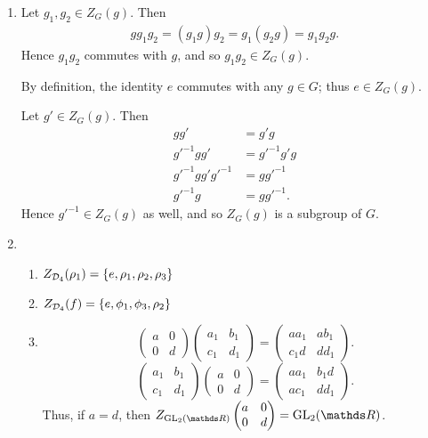 \documentclass{homework}
\begin{document}
\begin{solution}
  \begin{enumerate}[label=(\alph*)]
    \item Let $ g_1,g_2\in Z_G(g)$. Then
      \begin{align*}
        gg_1g_2=(g_1g)g_2=g_1(g_2g)=g_1g_2g 
      .\end{align*} Hence $g_1g_2$ commutes with $g$, and so $g_1g_2\in Z_G(g)$.

      By definition, the identity $e$ commutes with any $g\in G$; thus $e\in Z_G(g)$.

      Let $g'\in Z_G(g)$. Then
      \begin{align*}
        gg'&= g'g \\
        g'^{-1}gg'&= g'^{-1}g'g \\
        g'^{-1}gg'g'^{-1}&= gg'^{-1} \\
        g'^{-1}g&=gg'^{-1}
      .\end{align*} Hence $g'^{-1}\in Z_G(g)$ as well, and so $Z_G(g)$ is a subgroup of $G$.
    \item
      \begin{enumerate}
        \item $Z_{\mathcal{D}_4}(\rho_1)=\{ e, \rho_1,\rho_2,\rho_3 \}$
        \item $Z_{\mathcal{D}_4}(f)=\{ e, \phi_1, \phi_3, \rho_2 \}$ 
        \item 
          \[
            \begin{pmatrix} a&0\\0&d \end{pmatrix} \begin{pmatrix} a_1&b_1\\c_1&d_1 \end{pmatrix}
            =\begin{pmatrix} aa_1&ab_1\\c_1d&dd_1 \end{pmatrix} 
          .\] 
          \[
            \begin{pmatrix} a_1&b_1\\c_1&d_1 \end{pmatrix} \begin{pmatrix} a&0\\0&d \end{pmatrix}
            =\begin{pmatrix} aa_1&b_1d\\ac_1&dd_1 \end{pmatrix} 
          .\] 
            Thus, if $a=d$, then $Z_{\GL_2(\R)}\begin{pmatrix} a&0\\0&d \end{pmatrix} =\GL_2(\R)$.

\end{enumerate}
\end{enumerate}
\end{solution}
\end{document}
